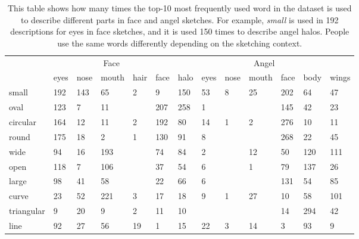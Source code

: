 \begin{table}[!htb]
\begin{minipage}{1\textwidth}
\begin{center}
{\small
\begin{tabular}{p{5em} | p{1.5em}p{1.5em}p{2em}p{1.5em}p{1.5em} | p{1.5em}p{1.5em}p{1.5em}p{2em}p{1.5em}p{1.5em}p{1.5em} }
\toprule
~ & \multicolumn{5}{c}{Face} & \multicolumn{7}{c}{Angel}\\
~ & eyes & nose & mouth & hair & face & halo & eyes & nose & mouth & face & body & wings  \\
\midrule
small & 192 & 143 & 65 & 2 & 9 & 150 & 53 & 8 & 25 & 202 & 64 & 47 \\
oval & 123 & 7 & 11 &   & 207 & 258 & 1 &   &   & 145 & 42 & 23 \\
circular & 164 & 12 & 11 & 2 & 192 & 80 & 14 & 1 & 2 & 276 & 10 & 11 \\
round & 175 & 18 & 2 & 1 & 130 & 91 & 8 &   &   & 268 & 22 & 45 \\
wide & 94 & 16 & 193 &   & 74 & 84 & 2 &   & 12 & 50 & 120 & 111 \\
open & 118 & 7 & 106 &   & 37 & 54 & 6 &   & 1 & 79 & 137 & 26 \\
large & 98 & 41 & 58 &   & 22 & 66 & 6 &   &   & 131 & 54 & 85 \\
curve & 23 & 52 & 221 & 3 & 17 & 18 & 9 & 1 & 27 & 10 & 58 & 101 \\
triangular & 9 & 20 & 9 & 2 & 11 & 10 &   &   &   & 14 & 294 & 42 \\
line & 92 & 27 & 56 & 19 & 1 & 15 & 22 & 3 & 14 & 3 & 93 & 9\\
\bottomrule
\end{tabular}}
\caption{This table shows how many times the top-10 most frequently used word in the dataset is used to describe different parts in face and angel sketches. For example, \textit{small} is used in 192 descriptions for eyes in face sketches, and it is used 150 times to describe angel halos. People use the same words differently depending on the sketching context.}
\label{table:parts_share_description}
\end{center}
\end{minipage}
\end{table}

